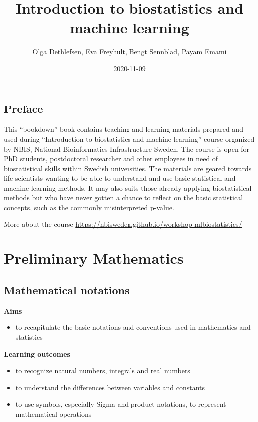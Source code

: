\documentclass[
]{book}
\title{Introduction to biostatistics and machine learning}
\author{Olga Dethlefsen, Eva Freyhult, Bengt Sennblad, Payam Emami}
\date{2020-11-09}
\providecommand{\tightlist}{%
  \setlength{\itemsep}{0pt}\setlength{\parskip}{0pt}}
\theoremstyle{definition}
\theoremstyle{definition}
\theoremstyle{definition}
\theoremstyle{remark}
\begin{document}
\maketitle

{
\setcounter{tocdepth}{1}
\tableofcontents
}
\hypertarget{preface}{%
\chapter*{Preface}\label{preface}}

This ``bookdown'' book contains teaching and learning materials prepared and used during ``Introduction to biostatistics and machine learning'' course organized by NBIS, National Bioinformatics Infrastructure Sweden. The course is open for PhD students, postdoctoral researcher and other employees in need of biostatistical skills within Swedish universities. The materials are geared towards life scientists wanting to be able to understand and use basic statistical and machine learning methods. It may also suits those already applying biostatistical methods but who have never gotten a chance to reflect on the basic statistical concepts, such as the commonly misinterpreted p-value.

More about the course \url{https://nbisweden.github.io/workshop-mlbiostatistics/}

\hypertarget{part-preliminary-mathematics}{%
\part{Preliminary Mathematics}\label{part-preliminary-mathematics}}

\hypertarget{mathematical-notations}{%
\chapter{Mathematical notations}\label{mathematical-notations}}

\textbf{Aims}

\begin{itemize}
\tightlist
\item
  to recapitulate the basic notations and conventions used in mathematics and statistics
\end{itemize}

\textbf{Learning outcomes}

\begin{itemize}
\tightlist
\item
  to recognize natural numbers, integrals and real numbers
\item
  to understand the differences between variables and constants
\item
  to use symbols, especially Sigma and product notations, to represent mathematical operations
\end{itemize}
\end{document}
